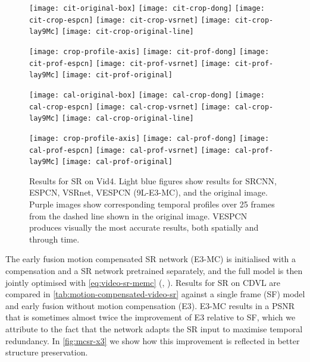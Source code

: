 \documentclass[10pt,twocolumn,letterpaper]{article}
\begin{document}
\begin{figure*}
\centering
	\texttt{[image: cit-original-box]}	
	\texttt{[image: cit-crop-dong]}
	\texttt{[image: cit-crop-espcn]}
	\texttt{[image: cit-crop-vsrnet]}
	\texttt{[image: cit-crop-lay9Mc]}
	\texttt{[image: cit-crop-original-line]}
	
	\texttt{[image: crop-profile-axis]}
	\texttt{[image: cit-prof-dong]}
	\texttt{[image: cit-prof-espcn]}
	\texttt{[image: cit-prof-vsrnet]}
	\texttt{[image: cit-prof-lay9Mc]}
	\texttt{[image: cit-prof-original]}
	
	\vspace{2mm}
	
	\texttt{[image: cal-original-box]}	
	\texttt{[image: cal-crop-dong]}
	\texttt{[image: cal-crop-espcn]}
	\texttt{[image: cal-crop-vsrnet]}
	\texttt{[image: cal-crop-lay9Mc]}
	\texttt{[image: cal-crop-original-line]}
	
	\texttt{[image: crop-profile-axis]}
	\texttt{[image: cal-prof-dong]}
	\texttt{[image: cal-prof-espcn]}
	\texttt{[image: cal-prof-vsrnet]}
	\texttt{[image: cal-prof-lay9Mc]}
	\texttt{[image: cal-prof-original]}
	
	\caption{Results for  \gls{SR} on Vid4. Light blue figures show results for SRCNN, ESPCN, VSRnet, VESPCN (9L-E3-MC), and the original image. Purple images show corresponding temporal profiles over 25 frames from the dashed line shown in the original image. VESPCN produces visually the most accurate results, both spatially and through time.}
	\label{fig:set4-visualisation}
\end{figure*}

The early fusion motion compensated \gls{SR} network (E3-MC) is initialised with a compensation and a \gls{SR} network pretrained separately, and the full model is then jointly optimised with \cref{eq:video-sr-memc} (, ). Results for  \gls{SR} on CDVL are compared in \cref{tab:motion-compensated-video-sr} against a single frame (SF) model and early fusion without motion compensation (E3). E3-MC results in a \gls{PSNR} that is sometimes almost twice the improvement of E3 relative to SF, which we attribute to the fact that the network adapts the \gls{SR} input to maximise temporal redundancy. In \cref{fig:mcsr-x3} we show how this improvement is reflected in better structure preservation.
\end{document}
